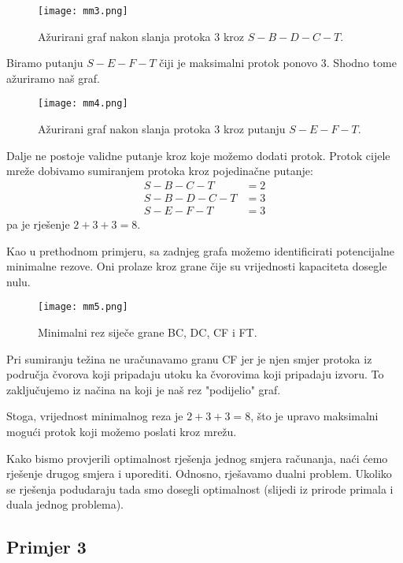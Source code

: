 \documentclass[11pt, a4paper]{article}
\begin{document}
	\pagebreak
	\begin{figure}[h]
		\centering
		\texttt{[image: mm3.png]}
		\caption{Ažurirani graf nakon slanja protoka 3 kroz $S-B-D-C-T$.}
		\label{fig:mm3}
	\end{figure}
	
	Biramo putanju $S-E-F-T$ čiji je maksimalni protok ponovo 3. Shodno tome ažuriramo naš graf.
	
	\begin{figure}[h]
		\centering
		\texttt{[image: mm4.png]}
		\caption{Ažurirani graf nakon slanja protoka 3 kroz putanju $S-E-F-T$.}
		\label{fig:mm4}
	\end{figure}
	
	Dalje ne postoje validne putanje kroz koje možemo dodati protok. Protok cijele mreže dobivamo sumiranjem protoka kroz pojedinačne putanje:
	\begin{align*}
		S-B-C-T &= 2\\
		S-B-D-C-T &= 3\\
		S-E-F-T &= 3
	\end{align*}
	pa je rješenje $2+3+3=8$.
	
	Kao u prethodnom primjeru, sa zadnjeg grafa možemo identificirati potencijalne minimalne rezove. Oni prolaze kroz grane čije su vrijednosti kapaciteta dosegle nulu.
	
	\pagebreak
	\begin{figure}[h]
		\centering
		\texttt{[image: mm5.png]}
		\caption{Minimalni rez siječe grane BC, DC, CF i FT.}
		\label{fig:mm5}
	\end{figure}
	
	Pri sumiranju težina ne uračunavamo granu CF jer je njen smjer protoka iz područja čvorova koji pripadaju utoku ka čvorovima koji pripadaju izvoru. To zaključujemo iz načina na koji je naš rez "podijelio" graf.
	
	Stoga, vrijednost minimalnog reza je $2+3+3=8$, što je upravo maksimalni mogući protok koji možemo poslati kroz mrežu.
	
	Kako bismo provjerili optimalnost rješenja jednog smjera računanja, naći ćemo rješenje drugog smjera i uporediti. Odnosno, rješavamo dualni problem. Ukoliko se rješenja podudaraju tada smo dosegli optimalnost (slijedi iz prirode primala i duala jednog problema).
	
	\newpage
	\subsection{Primjer 3}
	
\end{document}
